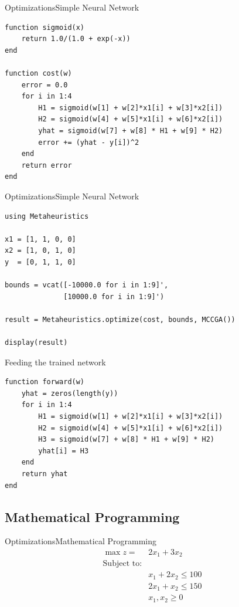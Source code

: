 \documentclass[11pt]{beamer}
\begin{document}
\begin{frame}[fragile]{Optimizations}{Simple Neural Network}
\begin{lstlisting}[basicstyle=\tiny]
function sigmoid(x)
	return 1.0/(1.0 + exp(-x))
end 

function cost(w)
	error = 0.0
	for i in 1:4
		H1 = sigmoid(w[1] + w[2]*x1[i] + w[3]*x2[i])
		H2 = sigmoid(w[4] + w[5]*x1[i] + w[6]*x2[i])
		yhat = sigmoid(w[7] + w[8] * H1 + w[9] * H2)
		error += (yhat - y[i])^2
	end 
	return error 
end 
\end{lstlisting}
\end{frame}

\begin{frame}[fragile]{Optimizations}{Simple Neural Network}
\begin{lstlisting}[basicstyle=\small]
using Metaheuristics 

x1 = [1, 1, 0, 0]
x2 = [1, 0, 1, 0]
y  = [0, 1, 1, 0]

bounds = vcat([-10000.0 for i in 1:9]', 
			  [10000.0 for i in 1:9]')

result = Metaheuristics.optimize(cost, bounds, MCCGA())

display(result)
\end{lstlisting}
\end{frame}

\begin{frame}[fragile]{Feeding the trained network}
\begin{lstlisting}[basicstyle=\small]
function forward(w)
	yhat = zeros(length(y))
	for i in 1:4
		H1 = sigmoid(w[1] + w[2]*x1[i] + w[3]*x2[i])
		H2 = sigmoid(w[4] + w[5]*x1[i] + w[6]*x2[i])
		H3 = sigmoid(w[7] + w[8] * H1 + w[9] * H2)
		yhat[i] = H3
	end 
	return yhat
end 
\end{lstlisting}
\end{frame}

\subsection{Mathematical Programming}
\begin{frame}[fragile]{Optimizations}{Mathematical Programming}
$$
\begin{aligned}
\max z = & 2x_1 + 3x_2 \\
\text{Subject to:}\\
& x_1 + 2x_2 \le 100 \\
& 2x_1 + x_2 \le 150 \\
& x_1, x_2 \ge 0
\end{aligned}
$$
\end{frame}
\end{document}
